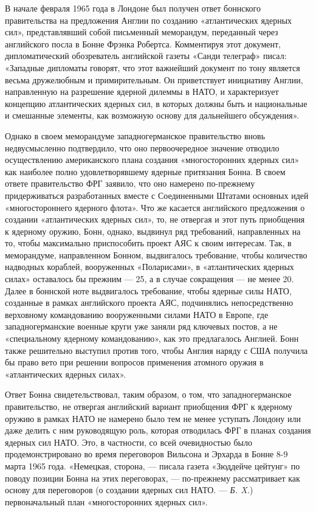 \documentclass[12pt, a4paper, openany]{book}
\begin{document}
		
		В начале февраля 1965 года в Лондоне был получен ответ боннского правительства на предложения Англии по созданию «атлантических ядерных сил», представлявший собой письменный меморандум, переданный через английского посла в Бонне Фрэнка Робертса. Комментируя этот документ, дипломатический обозреватель английской газеты «Санди телеграф» писал: «Западные дипломаты говорят, что этот важнейший документ по тону является весьма дружелюбным и примирительным. Он приветствует инициативу Англии, направленную на разрешение ядерной дилеммы в НАТО, и характеризует концепцию атлантических ядерных сил, в которых должны быть и национальные и смешанные элементы, как возможную основу для дальнейшего обсуждения».
		
		Однако в своем меморандуме западногерманское правительство вновь недвусмысленно подтвердило, что оно первоочередное значение отводило осуществлению американского плана создания «многосторонних ядерных сил» как наиболее полно удовлетворявшему ядерные притязания Бонна. В своем ответе правительство ФРГ заявило, что оно намерено по-прежнему придерживаться разработанных вместе с Соединенными Штатами основных идей «многостороннего ядерного флота». Что же касается английского предложения о создании «атлантических ядерных сил», то, не отвергая и этот путь приобщения к ядерному оружию, Бонн, однако, выдвинул ряд требований, направленных на то, чтобы максимально приспособить проект АЯС к своим интересам. Так, в меморандуме, направленном Бонном, выдвигалось требование, чтобы количество надводных кораблей, вооруженных «Поларисами», в «атлантических ядерных силах» оставалось бы прежним — 25, а в случае сокращения — не менее 20. Далее в боннской ноте выдвигалось требование, чтобы ядерные силы НАТО, созданные в рамках английского проекта АЯС, подчинялись непосредственно верховному командованию вооруженными силами НАТО в Европе, где западногерманские военные круги уже заняли ряд ключевых постов, а не «специальному ядерному командованию», как это предлагалось Англией. Бонн также решительно выступил против того, чтобы Англия наряду с США получила бы право вето при решении вопросов применения атомного оружия в «атлантических ядерных силах».
		
		Ответ Бонна свидетельствовал, таким образом, о том, что западногерманское правительство, не отвергая английский вариант приобщения ФРГ к ядерному оружию в рамках НАТО не намерено было тем не менее уступать Лондону или даже делить с ним руководящую роль, которая отводилась ФРГ в планах создания ядерных сил НАТО. Это, в частности, со всей очевидностью было продемонстрировано во время переговоров Вильсона и Эрхарда в Бонне 8-9 марта 1965 года. «Немецкая, сторона, — писала газета «Зюддейче цейтунг» по поводу позиции Бонна на этих переговорах, — по-прежнему рассматривает как основу для переговоров (о создании ядерных сил НАТО. — \textit{Б. X.}) первоначальный план «многосторонних ядерных сил».
		
\end{document}
